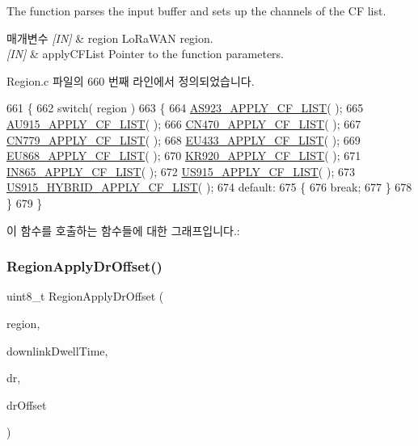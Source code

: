 The function parses the input buffer and sets up the channels of the CF list. 


\begin{DoxyParams}{매개변수}
{\em \mbox{[}\+I\+N\mbox{]}} & region Lo\+Ra\+W\+AN region.\\
\hline
{\em \mbox{[}\+I\+N\mbox{]}} & apply\+C\+F\+List Pointer to the function parameters. \\
\hline
\end{DoxyParams}


Region.\+c 파일의 660 번째 라인에서 정의되었습니다.


\begin{DoxyCode}
661 \{
662     \textcolor{keywordflow}{switch}( region )
663     \{
664         \mbox{\hyperlink{_region_8c_ac79db5f796c4a24b7ea51e5b3ac24c02}{AS923\_APPLY\_CF\_LIST}}( );
665         \mbox{\hyperlink{_region_8c_a2c08d8ba366bf75d4d7cc1494a0e4cc0}{AU915\_APPLY\_CF\_LIST}}( );
666         \mbox{\hyperlink{_region_8c_a5a73e26d3a21c54d0575af34a3198725}{CN470\_APPLY\_CF\_LIST}}( );
667         \mbox{\hyperlink{_region_8c_ac697ae1b5b495e83a6c0183b042b36c2}{CN779\_APPLY\_CF\_LIST}}( );
668         \mbox{\hyperlink{_region_8c_a15d988281b0937765c297d5b69364c2f}{EU433\_APPLY\_CF\_LIST}}( );
669         \mbox{\hyperlink{_region_8c_a0c585341c69141ee72c35840888b4a48}{EU868\_APPLY\_CF\_LIST}}( );
670         \mbox{\hyperlink{_region_8c_a3af8cb30155da9f7ae16a6b2fe3e0362}{KR920\_APPLY\_CF\_LIST}}( );
671         \mbox{\hyperlink{_region_8c_abf85e136162f5e0a0a4008d2da4178a5}{IN865\_APPLY\_CF\_LIST}}( );
672         \mbox{\hyperlink{_region_8c_ac2b109b2c62f11b521b73eae08776c64}{US915\_APPLY\_CF\_LIST}}( );
673         \mbox{\hyperlink{_region_8c_a11664a90a25b4a3775c9496c6a667f8b}{US915\_HYBRID\_APPLY\_CF\_LIST}}( );
674         \textcolor{keywordflow}{default}:
675         \{
676             \textcolor{keywordflow}{break};
677         \}
678     \}
679 \}
\end{DoxyCode}
이 함수를 호출하는 함수들에 대한 그래프입니다.\+:
\mbox{\label{group___r_e_g_i_o_n_gab62221e1ca566a89f4b450b30bfb95a7}} 
\subsubsection{\texorpdfstring{Region\+Apply\+Dr\+Offset()}{RegionApplyDrOffset()}}
{\footnotesize\ttfamily uint8\+\_\+t Region\+Apply\+Dr\+Offset (\begin{DoxyParamCaption}\item[{\mbox{\hyperlink{group___l_o_r_a_m_a_c_ga80c48efda9ae02e14b58160d34a798dd}{Lo\+Ra\+Mac\+Region\+\_\+t}}}]{region,  }\item[{uint8\+\_\+t}]{downlink\+Dwell\+Time,  }\item[{int8\+\_\+t}]{dr,  }\item[{int8\+\_\+t}]{dr\+Offset }\end{DoxyParamCaption})}



